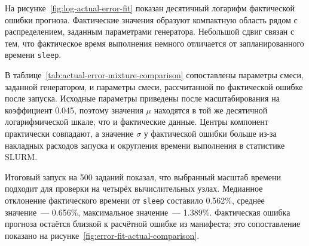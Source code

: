 
На рисунке~\ref{fig:log-actual-error-fit} показан десятичный логарифм фактической ошибки прогноза. Фактические значения образуют компактную область рядом с распределением, заданным параметрами генератора. Небольшой сдвиг связан с тем, что фактическое время выполнения немного отличается от запланированного времени \texttt{sleep}.


В таблице~\ref{tab:actual-error-mixture-comparison} сопоставлены параметры смеси, заданной генератором, и параметры смеси, рассчитанной по фактической ошибке после запуска. Исходные параметры приведены после масштабирования на коэффициент 0.045, поэтому значения $\mu$ находятся в той же десятичной логарифмической шкале, что и фактические данные. Центры компонент практически совпадают, а значение $\sigma$ у фактической ошибки больше из-за накладных расходов запуска и округления времени выполнения в статистике SLURM.

\begin{table}[H]
    \centering
    \caption{Сравнение параметров ошибки прогноза до и после запуска}
    \label{tab:actual-error-mixture-comparison}
\end{table}

Итоговый запуск на 500 заданий показал, что выбранный масштаб времени подходит для проверки на четырёх вычислительных узлах. Медианное отклонение фактического времени от \texttt{sleep} составило 0.562\%, среднее значение~--- 0.656\%, максимальное значение~--- 1.389\%. Фактическая ошибка прогноза остаётся близкой к расчётной ошибке из манифеста; это сопоставление показано на рисунке~\ref{fig:error-fit-actual-comparison}.
